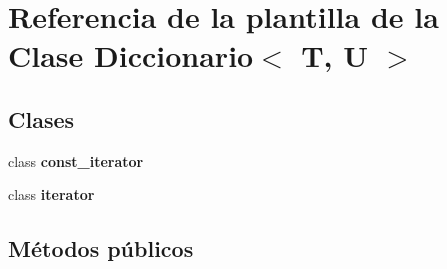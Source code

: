 \section{Referencia de la plantilla de la Clase Diccionario$<$ T, U $>$}
\label{classDiccionario}
\subsection*{Clases}
\begin{DoxyCompactItemize}
\item 
class {\bf const\+\_\+iterator}
\item 
class {\bf iterator}
\end{DoxyCompactItemize}
\subsection*{Métodos públicos}
